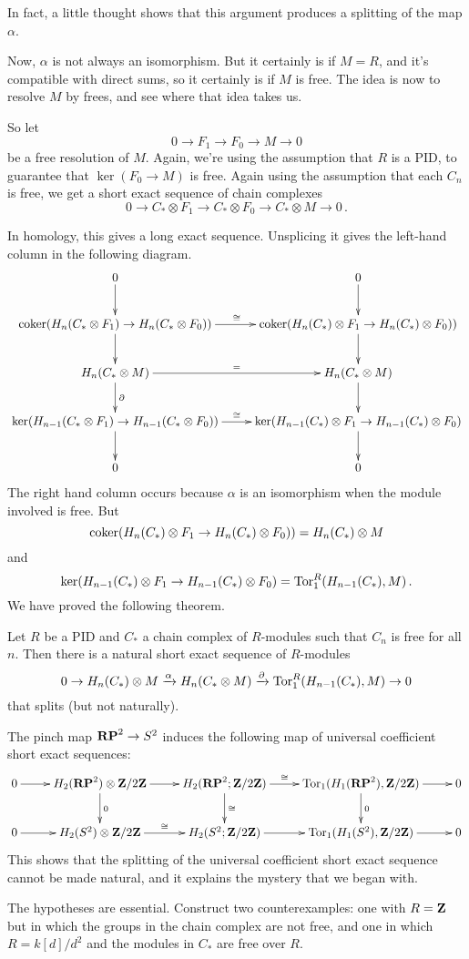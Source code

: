 In fact, a little thought shows that this argument produces a splitting of
the map $\alpha$. 

Now, $\alpha$ is not always an isomorphism. But it certainly is if $M=R$, 
and it's compatible with direct sums, so it certainly is if $M$ is free. 
The idea is now to resolve $M$ by frees, and see where that idea takes us.

So let 
\[
0\to F_1\to F_0\to M\to0
\]
be a free resolution of $M$. Again, we're using the assumption that $R$ is
a PID, to guarantee that $\ker(F_0\to M)$ is free. Again using the assumption
that each $C_n$ is free, we get a short exact sequence of chain complexes
\[
0\to C_*\otimes F_1\to C_*\otimes F_0\to C_*\otimes M\to0\,.
\]

In homology, this gives a long exact sequence. Unsplicing it gives the
left-hand column in the following diagram.
\begin{equation*}
\xymatrix{
0 \ar[d] & 0\ar[d] \\
\coker(H_n(C_\ast\otimes F_1)\to H_n(C_\ast\otimes F_0)) \ar[d] \ar[r]^\cong 
& \coker(H_n(C_\ast)\otimes F_1\to H_n(C_\ast)\otimes F_0)) \ar[d] \\
H_n(C_\ast\otimes M) \ar[d]^\partial \ar[r]^= & 
H_n(C_\ast\otimes M) \ar[d]\\
\ker( H_{n-1}(C_\ast\otimes F_1)\to H_{n-1}(C_\ast\otimes F_0))
\ar[r]^\cong\ar[d] & 
\ker(H_{n-1}(C_*)\otimes F_1\to H_{n-1}(C_*)\otimes F_0) \ar[d]\\
0 & 0}
\end{equation*}
The right hand column occurs because $\alpha$ is an isomorphism when the module
involved is free. But 
\[
\operatorname{coker}(H_n(C_\ast)\otimes F_1\to H_n(C_\ast)\otimes F_0))=H_n(C_*)\otimes M
\]
and
\[
\ker(H_{n-1}(C_\ast)\otimes F_1\to H_{n-1}(C_\ast)\otimes F_0)=
\operatorname{Tor}^R_1(H_{n-1}(C_\ast),M)\,.
\]
We have proved the following theorem.
\begin{theorem}
Let $R$ be a PID and $C_\ast$ a chain complex of $R$-modules such that $C_n$ 
is free for all $n$. Then there is a natural short 
exact sequence of $R$-modules
\begin{equation*}
0\to H_n(C_\ast)\otimes M\xrightarrow{\alpha} H_n(C_\ast\otimes M)\xrightarrow{\partial}\operatorname{Tor}^R_1( H_{n-1}(C_\ast),M)\to 0
\end{equation*}
that splits (but not naturally).
\end{theorem}
\begin{example}
The pinch map $\mathbf{RP}^2\to S^2$ induces the following map of universal
coefficient short exact sequences:
\[
\xymatrix{
0 \ar[r] & H_2(\RP^2)\otimes\Z/2\Z \ar[d]^0 \ar[r] & 
H_2(\RP^2;\Z/2\Z) \ar[d]^\cong \ar[r]^-\cong & 
\Tor_1(H_1(\RP^2),\Z/2\Z) \ar[d]^0 \ar[r] & 0 \\
0 \ar[r] & H_2(S^2)\otimes\Z/2\Z \ar[r]^-\cong & H_2(S^2;\Z/2\Z) \ar[r] &
\Tor_1(H_1(S^2),\Z/2\Z) \ar[r] & 0 
}\]
This shows that the splitting of the universal coefficient short exact 
sequence cannot be made natural, and it explains the mystery that we began 
with.
\end{example}
\begin{exercise}
The hypotheses are essential. Construct two counterexamples:
one with $R=\mathbf Z$ but in which the groups in the chain complex are not free,
and one in which $R=k[d]/d^2$ and the modules in $C_*$ are free over $R$.  
\end{exercise}

